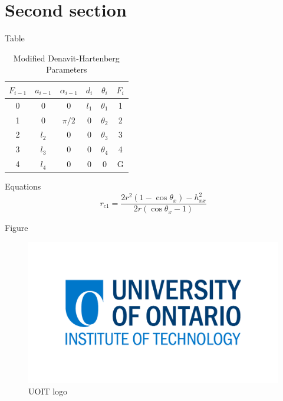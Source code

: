 \documentclass{beamer}
\begin{document}
  \section{Second section}

    \begin{frame}{Table}
      \begin{table}[h]
      \centering
      \caption{Modified Denavit-Hartenberg Parameters}
        \begin{tabular}{cccccc}
          \toprule
          $F_{i-1}$ & $a_{i-1}$ & $\alpha_{i-1}$ & $d_i$ & $\theta_i$ & $F_i$ \\
          \midrule
          0 & 0 & 0 & $l_1$ & $\theta_1$ & 1 \\
          1 & 0 & $\pi/2$ & 0 & $\theta_2$ & 2 \\
          2 & $l_2$ & 0 & 0 & $\theta_3$ & 3 \\
          3 & $l_3$ & 0 & 0 & $\theta_4$ & 4 \\
          4 & $l_4$ & 0 & 0 & 0 & G \\
          \bottomrule
        \end{tabular}
      \label{tab:dh}
      \end{table}
    \end{frame}

    \begin{frame}{Equations}
      \begin{equation}
        \label{eq:1}
        r_{c1} = \frac{2r^2(1-\cos\theta_x)-h^2_{xx}}{2r(\cos\theta_x-1)}
      \end{equation}
    \end{frame}

    \begin{frame}{Figure}
      \begin{figure}
        \includegraphics[scale=1.0]{uoit.png}
        \caption{UOIT logo}
      \end{figure}
    \end{frame}
\end{document}
